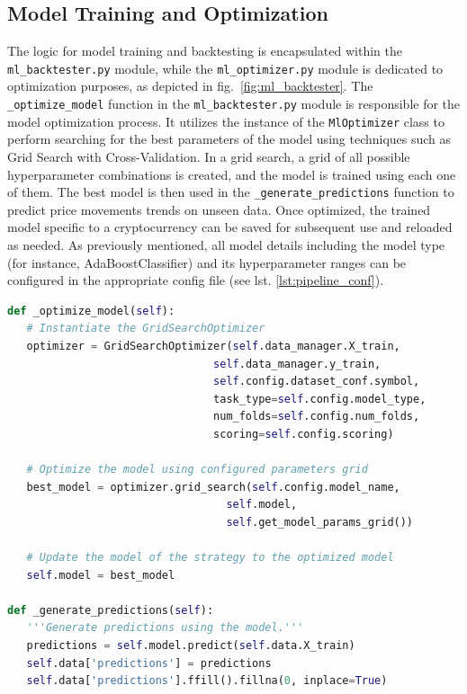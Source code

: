 \subsection{Model Training and Optimization}
The logic for model training and backtesting is encapsulated within the \texttt{ml\_backtester.py} module,
while the \texttt{ml\_optimizer.py} module is dedicated to optimization purposes, as depicted in fig.~\ref{fig:ml_backtester}.
The \texttt{\_optimize\_model} function in the \texttt{ml\_backtester.py} module is responsible for the model optimization process.
It utilizes the instance of the  \texttt{MlOptimizer} class to perform searching for the best parameters of the model using techniques such as Grid Search with Cross-Validation.
In a grid search, a grid of all possible hyperparameter combinations is created, and the model is trained using each one of them.
The best model is then used in the \texttt{\_generate\_predictions} function to predict price movements trends on unseen data.
Once optimized, the trained model specific to a cryptocurrency can be saved for subsequent use and reloaded as needed.
As previously mentioned, all model details including the model type (for instance, AdaBoostClassifier) and its hyperparameter ranges can be configured in the appropriate config file (see lst. \ref{lst:pipeline_conf}).


\noindent\begin{minipage}{\linewidth}
\begin{lstlisting}[style=pythonstyle, language=Python, caption={Function of MlBacktester class for model optimization and predictions.},  captionpos=b, label=lst:add_features_function]
def _optimize_model(self):
   # Instantiate the GridSearchOptimizer
   optimizer = GridSearchOptimizer(self.data_manager.X_train,
                                self.data_manager.y_train,
                                self.config.dataset_conf.symbol,
                                task_type=self.config.model_type,
                                num_folds=self.config.num_folds,
                                scoring=self.config.scoring)

   # Optimize the model using configured parameters grid
   best_model = optimizer.grid_search(self.config.model_name,
                                  self.model,
                                  self.get_model_params_grid())

   # Update the model of the strategy to the optimized model
   self.model = best_model

def _generate_predictions(self):
   '''Generate predictions using the model.'''
   predictions = self.model.predict(self.data.X_train)
   self.data['predictions'] = predictions
   self.data['predictions'].ffill().fillna(0, inplace=True)

\end{lstlisting}
\end{minipage}


